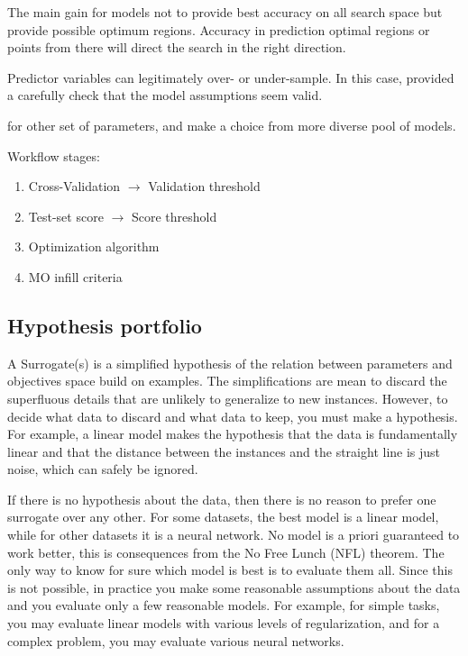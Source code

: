     The main gain for models not to provide best accuracy on all search space but provide possible optimum regions.
    Accuracy in prediction optimal regions or points from there will direct the search in the right direction.

    Predictor variables can legitimately over- or under-sample. 
    In this case, provided a carefully check that the model assumptions seem valid.

    for other set of parameters, and make a choice from more diverse pool of models.

    Workflow stages:
    \begin{enumerate}
        \item Cross-Validation $\rightarrow$ Validation threshold
        \item Test-set score $\rightarrow$ Score threshold
        \item Optimization algorithm
        \item MO infill criteria
    \end{enumerate}


    \subsection{Hypothesis portfolio}
    A Surrogate(s) is a simplified hypothesis of the relation between parameters and objectives space build on examples. The simplifications are mean to discard the superfluous details that are unlikely to generalize to new instances. However, to decide what data to discard and what data to keep, you must make a hypothesis. For example, a linear model makes the hypothesis that the data is fundamentally linear and that the distance between the instances and the straight line is just noise, which can safely be ignored.

    If there is no hypothesis about the data, then there is no reason to prefer one surrogate over any other.  For some datasets, the best model is a linear model, while for other datasets it is a neural network. No model is a priori guaranteed to work better, this is consequences from the No Free Lunch (NFL) theorem. The only way to know for sure which model is best is to evaluate them all. Since this is not possible, in practice you make some reasonable assumptions about the data and you evaluate only a few reasonable models. For example, for simple tasks, you may evaluate linear models with various levels of regularization, and for a complex problem, you may evaluate various neural networks.

